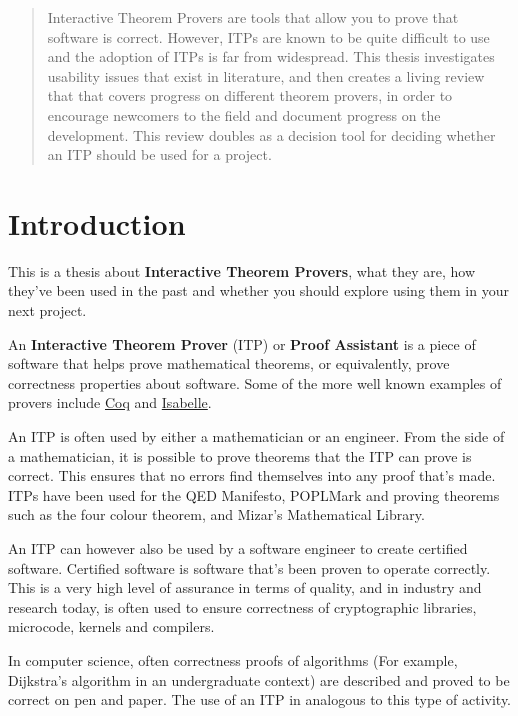 \documentclass[
]{article}
\begin{document}
\newpage

\begin{abstract}
Interactive Theorem Provers are tools that allow you to prove that
software is correct. However, ITPs are known to be quite difficult to
use and the adoption of ITPs is far from widespread. This thesis
investigates usability issues that exist in literature, and then creates
a living review that that covers progress on different theorem provers,
in order to encourage newcomers to the field and document progress on
the development. This review doubles as a decision tool for deciding
whether an ITP should be used for a project.
\end{abstract}
\newpage

\tableofcontents
\newpage

\hypertarget{introduction}{%
\section{Introduction}\label{introduction}}

This is a thesis about \textbf{Interactive Theorem Provers}, what they
are, how they've been used in the past and whether you should explore
using them in your next project.

An \textbf{Interactive Theorem Prover} (ITP) or \textbf{Proof Assistant}
is a piece of software that helps prove mathematical theorems, or
equivalently, prove correctness properties about software. Some of the
more well known examples of provers include
\href{https://coq.inria.fr/}{Coq} and
\href{https://isabelle.in.tum.de/}{Isabelle}.

An ITP is often used by either a mathematician or an engineer. From the
side of a mathematician, it is possible to prove theorems that the ITP
can prove is correct. This ensures that no errors find themselves into
any proof that's made. ITPs have been used for the QED Manifesto,
POPLMark and proving theorems such as the four colour theorem, and
Mizar's Mathematical Library.

An ITP can however also be used by a software engineer to create
certified software. Certified software is software that's been proven to
operate correctly. This is a very high level of assurance in terms of
quality, and in industry and research today, is often used to ensure
correctness of cryptographic libraries, microcode, kernels and
compilers.

In computer science, often correctness proofs of algorithms (For
example, Dijkstra's algorithm in an undergraduate context) are described
and proved to be correct on pen and paper. The use of an ITP in
analogous to this type of activity.
\end{document}

